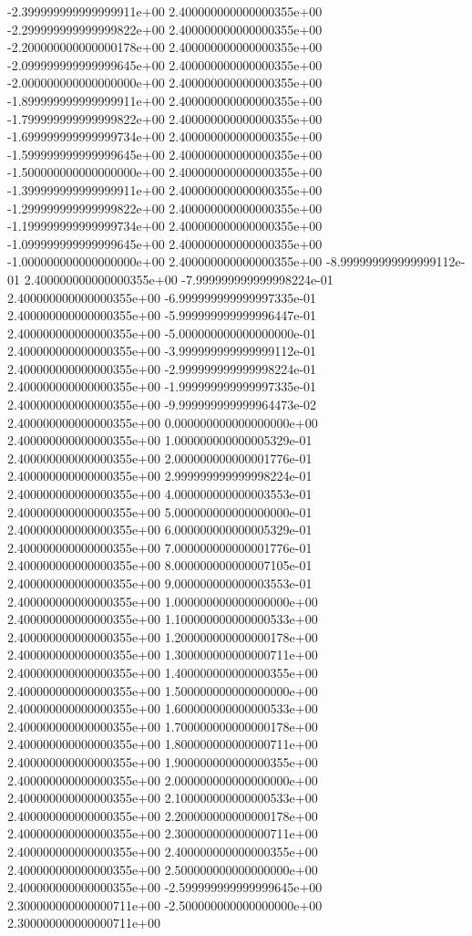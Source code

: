 -2.399999999999999911e+00 2.400000000000000355e+00
-2.299999999999999822e+00 2.400000000000000355e+00
-2.200000000000000178e+00 2.400000000000000355e+00
-2.099999999999999645e+00 2.400000000000000355e+00
-2.000000000000000000e+00 2.400000000000000355e+00
-1.899999999999999911e+00 2.400000000000000355e+00
-1.799999999999999822e+00 2.400000000000000355e+00
-1.699999999999999734e+00 2.400000000000000355e+00
-1.599999999999999645e+00 2.400000000000000355e+00
-1.500000000000000000e+00 2.400000000000000355e+00
-1.399999999999999911e+00 2.400000000000000355e+00
-1.299999999999999822e+00 2.400000000000000355e+00
-1.199999999999999734e+00 2.400000000000000355e+00
-1.099999999999999645e+00 2.400000000000000355e+00
-1.000000000000000000e+00 2.400000000000000355e+00
-8.999999999999999112e-01 2.400000000000000355e+00
-7.999999999999998224e-01 2.400000000000000355e+00
-6.999999999999997335e-01 2.400000000000000355e+00
-5.999999999999996447e-01 2.400000000000000355e+00
-5.000000000000000000e-01 2.400000000000000355e+00
-3.999999999999999112e-01 2.400000000000000355e+00
-2.999999999999998224e-01 2.400000000000000355e+00
-1.999999999999997335e-01 2.400000000000000355e+00
-9.999999999999964473e-02 2.400000000000000355e+00
0.000000000000000000e+00 2.400000000000000355e+00
1.000000000000005329e-01 2.400000000000000355e+00
2.000000000000001776e-01 2.400000000000000355e+00
2.999999999999998224e-01 2.400000000000000355e+00
4.000000000000003553e-01 2.400000000000000355e+00
5.000000000000000000e-01 2.400000000000000355e+00
6.000000000000005329e-01 2.400000000000000355e+00
7.000000000000001776e-01 2.400000000000000355e+00
8.000000000000007105e-01 2.400000000000000355e+00
9.000000000000003553e-01 2.400000000000000355e+00
1.000000000000000000e+00 2.400000000000000355e+00
1.100000000000000533e+00 2.400000000000000355e+00
1.200000000000000178e+00 2.400000000000000355e+00
1.300000000000000711e+00 2.400000000000000355e+00
1.400000000000000355e+00 2.400000000000000355e+00
1.500000000000000000e+00 2.400000000000000355e+00
1.600000000000000533e+00 2.400000000000000355e+00
1.700000000000000178e+00 2.400000000000000355e+00
1.800000000000000711e+00 2.400000000000000355e+00
1.900000000000000355e+00 2.400000000000000355e+00
2.000000000000000000e+00 2.400000000000000355e+00
2.100000000000000533e+00 2.400000000000000355e+00
2.200000000000000178e+00 2.400000000000000355e+00
2.300000000000000711e+00 2.400000000000000355e+00
2.400000000000000355e+00 2.400000000000000355e+00
2.500000000000000000e+00 2.400000000000000355e+00
-2.599999999999999645e+00 2.300000000000000711e+00
-2.500000000000000000e+00 2.300000000000000711e+00
